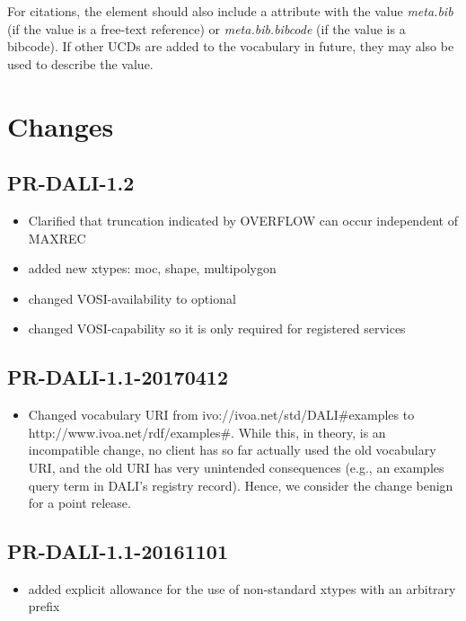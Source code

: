 \documentclass[11pt,letter]{ivoa}
\begin{document}
For citations, the  element should also include a
 attribute with the 
value \emph{meta.bib} (if the value is a free-text reference) or
\emph{meta.bib.bibcode} (if 
the value is a bibcode). If other  UCDs are added to the vocabulary in 
future, they may also be used to describe the value.

\appendix

\section{Changes}

\subsection{PR-DALI-1.2}
\begin{itemize}
\item Clarified that truncation indicated by OVERFLOW can occur independent of
MAXREC
\item added new xtypes: moc, shape, multipolygon
\item changed VOSI-availability to optional
\item changed VOSI-capability so it is only required for registered services
\end{itemize}

\subsection{PR-DALI-1.1-20170412}

\begin{itemize}
\item Changed vocabulary URI from ivo://ivoa.net/std/DALI\#examples to
http://www.ivoa.net/rdf/examples\#.  While this, in theory, is an
incompatible change, no client has so far actually used the old vocabulary
URI, and the old URI has very unintended consequences (e.g., an
examples query term in DALI's registry record).  Hence, we consider the
change benign for a point release.
\end{itemize}

\subsection{PR-DALI-1.1-20161101}

\begin{itemize}
\item added explicit allowance for the use of non-standard xtypes with an 
arbitrary prefix
\end{itemize}
\end{document}
